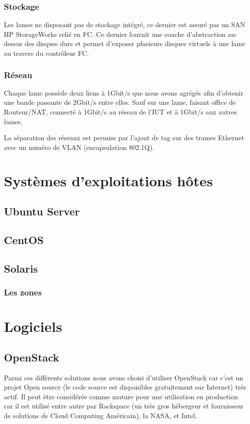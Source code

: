 \documentclass[a4paper,oneside]{report}
\begin{document}
\subsection{Stockage}
Les lames ne disposant pas de stockage intégré, ce dernier est assuré pas un SAN HP StorageWorks relié en FC.
Ce dernier fournit une couche d'abstraction au-dessus des disques durs et permet d'exposer plusieurs disques \og virtuels \fg à une lame au travers du contrôleur FC.

\subsection{Réseau}
Chaque lame possède deux liens à 1Gbit/s que nous avons agrégés afin d'obtenir une bande passante de 2Gbit/s entre elles.
Sauf sur une lame, faisant office de Routeur/NAT, connecté à 1Gbit/s au réseau de l'IUT et à 1Gbit/s aux autres lames.

La séparation des réseaux est permise par l'ajout de tag sur des trames Ethernet avec un numéro de VLAN (encapsulation 802.1Q).


\chapter{Systèmes d'exploitations hôtes}
\section{Ubuntu Server}

\section{CentOS}

\section{Solaris}

\subsection{Les zones}


\chapter{Logiciels}
\section{OpenStack}
Parmi ces différents solutions nous avons choisi d'utiliser OpenStack car c’est un projet Open source (le code source est disponibles gratuitement sur Internet) très actif.
Il peut être considérée comme mature pour une utilisation en production car il est utilisé entre autre par Rackspace (un très gros hébergeur et fournisseur de solutions de Cloud Computing Américain), la NASA, et Intel.
\end{document}
